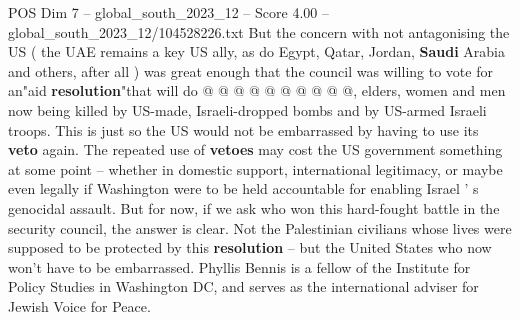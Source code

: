 \begin{textsample}{POS Dim 7 – global\_south\_2023\_12 – Score 4.00 – global\_south\_2023\_12/104528226.txt}
But the concern with not antagonising the US ( the UAE remains a key US ally, as do Egypt, Qatar, Jordan, \textbf{Saudi} Arabia and others, after all ) was great enough that the council was willing to vote for an"aid \textbf{resolution}"that will do @ @ @ @ @ @ @ @ @ @, elders, women and men now being killed by US-made, Israeli-dropped bombs and by US-armed Israeli troops.
This is just so the US would not be embarrassed by having to use its \textbf{veto} again.
The repeated use of \textbf{vetoes} may cost the US government something at some point -- whether in domestic support, international legitimacy, or maybe even legally if Washington were to be held accountable for enabling Israel ' s genocidal assault.
But for now, if we ask who won this hard-fought battle in the security council, the answer is clear.
Not the Palestinian civilians whose lives were supposed to be protected by this \textbf{resolution} -- but the United States who now won't have to be embarrassed.
Phyllis Bennis is a fellow of the Institute for Policy Studies in Washington DC, and serves as the international adviser for Jewish Voice for Peace.

\end{textsample}
